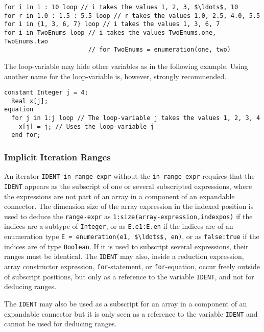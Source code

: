 \begin{example}
\begin{lstlisting}[language=modelica]
for i in 1 : 10 loop // i takes the values 1, 2, 3, $\ldots$, 10
for r in 1.0 : 1.5 : 5.5 loop // r takes the values 1.0, 2.5, 4.0, 5.5
for i in {1, 3, 6, 7} loop // i takes the values 1, 3, 6, 7
for i in TwoEnums loop // i takes the values TwoEnums.one, TwoEnums.two
                       // for TwoEnums = enumeration(one, two)
\end{lstlisting}
The loop-variable may hide other variables as in the following example.  Using another name for the loop-variable is, however, strongly recommended.
\begin{lstlisting}[language=modelica]
  constant Integer j = 4;
  Real x[j];
equation
  for j in 1:j loop // The loop-variable j takes the values 1, 2, 3, 4
    x[j] = j; // Uses the loop-variable j
  end for;
\end{lstlisting}
\end{example}

\subsubsection{Implicit Iteration Ranges}\label{implicit-iteration-ranges}

An iterator \lstinline!IDENT in range-expr! without the \lstinline!in range-expr! requires that the \lstinline!IDENT! appears as the subscript of one or several subscripted expressions, where the expressions are not part of an array in a component of an expandable connector.
The dimension size of the array expression in the indexed position is used to deduce the \lstinline!range-expr! as \lstinline!1:size(array-expression,indexpos)! if the indices are a subtype of \lstinline!Integer!, or as \lstinline!E.e1:E.en! if the indices are of an enumeration type \lstinline!E = enumeration(e1, $\ldots$, en)!, or as \lstinline!false:true! if the indices are of type \lstinline!Boolean!.
If it is used to subscript several expressions, their ranges must be identical.
The \lstinline!IDENT! may also, inside a reduction expression, array constructor expression, \lstinline!for!-statement, or \lstinline!for!-equation, occur freely outside of subscript positions, but only as a reference to the variable \lstinline!IDENT!, and not for deducing ranges.

The \lstinline!IDENT! may also be used as a subscript for an array in a component of an expandable connector
but it is only seen as a reference to the variable \lstinline!IDENT! and cannot be used for deducing ranges.

